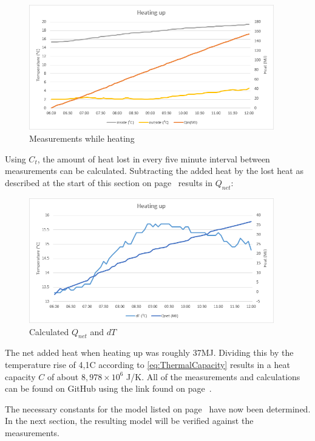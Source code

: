 \documentclass[12pt,a4paper,final]{report}
\begin{document}
\begin{figure}[H]
  \begin{center}
      \includegraphics[width=0.95\textwidth]{GraphHeatingMeasurements}
  \end{center}
  \caption{Measurements while heating}
\end{figure}
Using $C_{t}$, the amount of heat lost in every five minute interval between measurements can be calculated. Subtracting the added heat by the lost heat as described at the start of this section on page~\pageref{sec:CalculatePUC} results in $Q_{net}$:
\begin{figure}[H]
  \begin{center}
      \includegraphics[width=0.95\textwidth]{GraphHeatingMeasurements-calculated}
  \end{center}
  \caption{Calculated $Q_{net}$ and $dT$}
\end{figure}
The net added heat when heating up was roughly 37MJ. Dividing this by the temperature rise of 4,1\degree{}C according to \eqref{eq:ThermalCapacity} results in a heat capacity $C$ of about $8,978\times 10^{6}$ J/K. 
All of the measurements and calculations can be found on GitHub using the link found on page~\pageref{chap:Software}.

The necessary constants for the model listed on page~\pageref{variableDesc} have now been determined. In the next section, the resulting model will be verified against the measurements.
\end{document}
